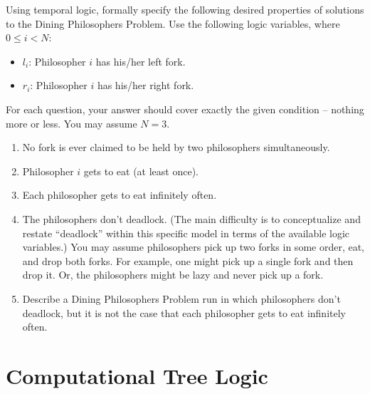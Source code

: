 \documentclass{elsarticle} %
\begin{document}
 Using temporal logic, formally specify the following desired properties of solutions to the Dining Philosophers Problem. Use the following logic variables, where $0 \le i < N$:
\begin{itemize}
\item $l_i$: Philosopher $i$ has his/her left fork.
\item $r_i$: Philosopher $i$ has his/her right fork.
\end{itemize}
For each question, your answer should cover exactly the given condition -- nothing more or less. You may assume $N=3$.
\begin{enumerate}
\item No fork is ever claimed to be held by two philosophers simultaneously.
\item Philosopher $i$ gets to eat (at least once).
\item Each philosopher gets to eat infinitely often.
\item The philosophers don't deadlock. (The main difficulty is to conceptualize and restate ``deadlock'' within this specific model in terms of the available logic variables.) You may assume philosophers pick up two forks in some order, eat, and drop both forks. For example, one might pick up a single fork and then drop it. Or, the philosophers might be lazy and never pick up a fork.
\item Describe a Dining Philosophers Problem run in which philosophers don't deadlock, but it is not the case that each philosopher gets to eat infinitely often.
\end{enumerate}


\section{Computational Tree Logic}
\end{document}
